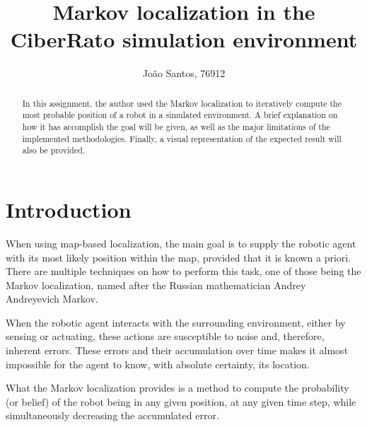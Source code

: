 \documentclass[runningheads]{llncs}
\begin{document}
%
\title{Markov localization in the CiberRato simulation environment 
}
%
%
\author{João Santos, 76912}
%
%
%
\maketitle              %
%
\begin{abstract}
In this assignment, the author used the Markov localization to iteratively compute the most probable position of a robot in a simulated environment. A brief explanation on how it has accomplish the goal will be given, as well as the major limitations of the implemented methodologies. Finally, a visual representation of the expected result will also be provided.

\end{abstract}
%
%
%
\section{Introduction}
\label{sec:introduction}

When using map-based localization, the main goal is to supply the robotic agent with its most likely position within the map, provided that it is known a priori. There are multiple techniques on how to perform this task, one of those being the Markov localization, named after the Russian mathematician Andrey Andreyevich Markov. 

When the robotic agent interacts with the surrounding environment, either by sensing or actuating, these actions are susceptible to noise and, therefore, inherent errors. These errors and their accumulation over time makes it almost impossible for the agent to know, with absolute certainty, its location.

What the Markov localization provides is a method to compute the probability (or belief) of the robot being in any given position, at any given time step, while simultaneously decreasing the accumulated error. 
\end{document}
